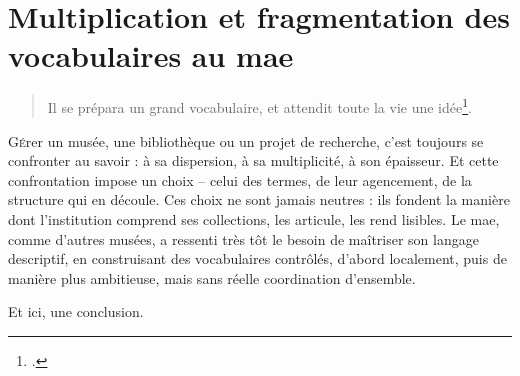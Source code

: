 \chapter[Les vocabulaires contrôlés au \ac{mae}]{\label{II-A} Multiplication et fragmentation des vocabulaires au \ac{mae}}

\begin{quote}
	\og Il se prépara un grand vocabulaire, et attendit toute la vie une idée\footcite{barneyPenseesDuneAmazone1920}.\fg
\end{quote}

\lettrine{G}érer un musée, une bibliothèque ou un projet de recherche, c’est toujours se confronter au savoir : à sa dispersion, à sa multiplicité, à son épaisseur. Et cette confrontation impose un choix – celui des termes, de leur agencement, de la structure qui en découle. Ces choix ne sont jamais neutres : ils fondent la manière dont l’institution comprend ses collections, les articule, les rend lisibles. Le \ac{mae}, comme d’autres musées, a ressenti très tôt le besoin de maîtriser son langage descriptif, en construisant des vocabulaires contrôlés, d’abord localement, puis de manière plus ambitieuse, mais sans réelle coordination d’ensemble.






\bigskip
\bigskip
\bigskip

Et ici, une conclusion.